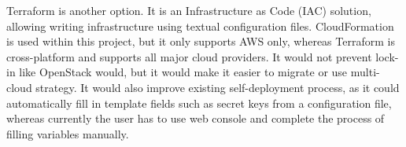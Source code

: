 Terraform is another option. It is an Infrastructure as Code (IAC) solution, allowing writing infrastructure using textual configuration files. CloudFormation is used within this project, but it only supports AWS only, whereas Terraform is cross-platform and supports all major cloud providers. It would not prevent lock-in like OpenStack would, but it would make it easier to migrate or use multi-cloud strategy. It would also improve existing self-deployment process, as it could automatically fill in template fields such as secret keys from a configuration file, whereas currently the user has to use web console and complete the process of filling variables manually.

